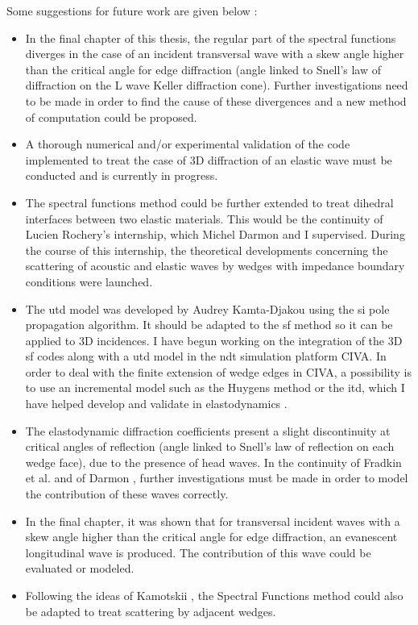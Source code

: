 Some suggestions for future work are given below :
\begin{itemize}
\item In the final chapter of this thesis, the regular part of the spectral functions diverges in the case of an incident transversal wave with a skew angle higher than the critical angle for edge diffraction (angle linked to Snell's law of diffraction on the L wave Keller diffraction cone). Further investigations need to be made in order to find the cause of these divergences and a new method of computation could be proposed.
\item A thorough numerical and/or experimental validation of the code implemented to treat the case of 3D diffraction of an elastic wave must be conducted and is currently in progress.
\item The spectral functions method could be further extended to treat dihedral interfaces between two elastic materials. This would be the continuity of Lucien Rochery's internship, which Michel Darmon and I supervised. During the course of this internship, the theoretical developments concerning the scattering of acoustic and elastic waves by wedges with impedance boundary conditions were launched.
\item The \acrshort{utd} model was developed by Audrey Kamta-Djakou \cite{AKDthese} using the \acrfull{si} pole propagation algorithm. It should be adapted to the \acrshort{sf} method so it can be applied to 3D incidences. I have begun working on the integration of the 3D \acrshort{sf} codes along with a \acrshort{utd} model in the \acrshort{ndt} simulation platform CIVA. In order to deal with the finite extension of wedge edges in CIVA, a possibility is to use an incremental model such as the Huygens method or the \acrfull{itd}, which I have helped develop and validate in elastodynamics \cite{articleITD}.
\item The elastodynamic diffraction coefficients present a slight discontinuity at critical angles of reflection (angle linked to Snell's law of reflection on each wedge face), due to the presence of head waves. In the continuity of Fradkin et al. \cite{FradkinDarmon} and of Darmon \cite{HDRMichel}, further investigations must be made in order to model the contribution of these waves correctly.
\item In the final chapter, it was shown that for transversal incident waves with a skew angle higher than the critical angle for edge diffraction, an evanescent longitudinal wave is produced. The contribution of this wave could be evaluated or modeled.
\item Following the ideas of Kamotskii \cite{Kamotski2}, the Spectral Functions method could also be adapted to treat scattering by adjacent wedges.
\end{itemize}